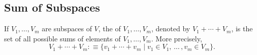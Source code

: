 
\subsection{Sum of Subspaces}

\setcounter{thm}{35}
\begin{mydef}
  If $V_1, \ldots, V_m$ are subspaces of $V$, the  of $V_1, \ldots, V_m$, denoted by $V_1 + \cdots + V_m$, is the set of all possible sums of elements of $V_1, \ldots, V_m$. More precisely,
\begin{equation}
    V_1 + \cdots + V_m :\equiv \{v_1 + \cdots + v_m \mid v_1 \in V_1, \, \dots \, , v_m \in V_m \}.
\end{equation}
\end{mydef}

